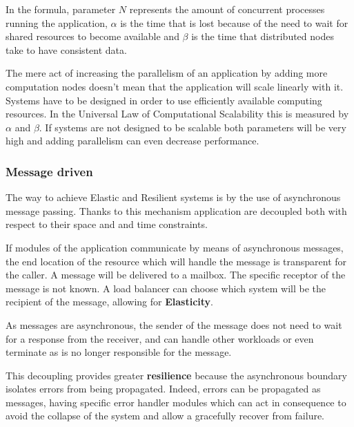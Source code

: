 \documentclass[../main.tex]{subfiles}
\begin{document}
In the formula, parameter $N$ represents the amount of concurrent processes
running the application, $\alpha$ is the time that is lost because of the need
to wait for shared resources to become available and $\beta$ is the time that
distributed nodes take to have consistent data.

The mere act of increasing the parallelism of an application by adding more
computation nodes doesn't mean that the application will scale linearly with it.
Systems have to be designed in order to use efficiently available computing resources.
In the Universal Law of Computational Scalability this is measured by $\alpha$
and $\beta$. If systems are not designed to be scalable both parameters will
be very high and adding parallelism can even decrease performance.

\subsubsection{Message driven}

The way to achieve Elastic and Resilient systems is by the use of asynchronous
message passing. Thanks to this mechanism application are decoupled both with respect to
their space and and time constraints.


If modules of the application communicate by means of asynchronous messages, the end
location of the resource which will handle the message is transparent for the
caller. A message will be delivered to a mailbox. The specific receptor of the
message is not known. A load balancer can choose which system will be the recipient
of the message, allowing for \textbf{Elasticity}.

As messages are asynchronous, the sender of the message does not need to wait for
a response from the receiver, and can handle other workloads or even
terminate as is no longer responsible for the message.

This decoupling provides greater \textbf{resilience} because the asynchronous
boundary isolates errors from being propagated. Indeed, errors can be propagated
as messages, having specific error handler modules which can act in consequence
to avoid the collapse of the system and allow a gracefully recover from failure.
\end{document}
